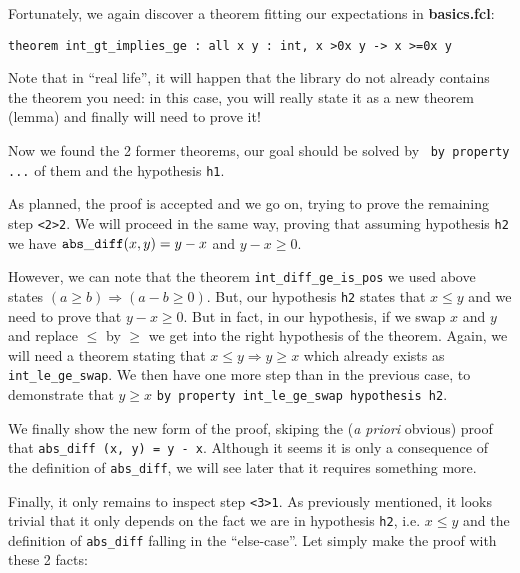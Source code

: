 \documentclass[11pt,a4paper,twoside,onecolumn,fullpage]{article}
\begin{document}
Fortunately, we again discover a theorem fitting our expectations in
\textbf{basics.fcl}:

{\scriptsize
\begin{lstlisting}
theorem int_gt_implies_ge : all x y : int, x >0x y -> x >=0x y
\end{lstlisting}}

Note that in ``real life'', it will happen that the library do not already
contains the theorem you need: in this case, you will really state it
as a new theorem (lemma) and finally will need to prove it!

Now we found the 2 former theorems, our goal should be solved by
\zenon\ \lstinline"by property ..." of them and the hypothesis
\lstinline"h1".

{\scriptsize
}

As planned, the proof is accepted and we go on, trying to prove the
remaining step \lstinline"<2>2". We will proceed in the same way,
proving that assuming hypothesis \lstinline"h2" we have
${\tt abs\_diff} (x, y) = y - x$ and $y - x \ge 0$.

However, we can note that the theorem \lstinline"int_diff_ge_is_pos"
we used above states  $(a \ge b) \Rightarrow (a - b \ge 0)$.
But, our hypothesis \lstinline"h2" states that $x \le y$ and we need
to prove that $y -x \ge 0$. But in fact, in our hypothesis, if we swap $x$ and
$y$ and replace $\le$ by $\ge$ we get into the right hypothesis of the
theorem. Again, we will need a theorem stating that
$x \le y \Rightarrow y \ge x$ which already exists as
\lstinline"int_le_ge_swap". We then have one more step than in the
previous case, to demonstrate that $y \ge x$
\lstinline"by property int_le_ge_swap hypothesis h2".

\medskip
We finally show the new form of the proof, skiping the ({\em a priori}
obvious) proof that {\tt abs\_diff (x, y) = y - x}. Although it seems
it is only a consequence of the definition of \lstinline{abs_diff}, we
will see later that it requires something more.

{\scriptsize
}

Finally, it only remains to inspect step \lstinline"<3>1". As
previously mentioned, it looks trivial that it only depends on the
fact we are in hypothesis \lstinline"h2", i.e. $x \le y$ and the
definition of \lstinline"abs_diff" falling in the ``else-case''. Let
simply make the proof with these 2 facts:
\end{document}
